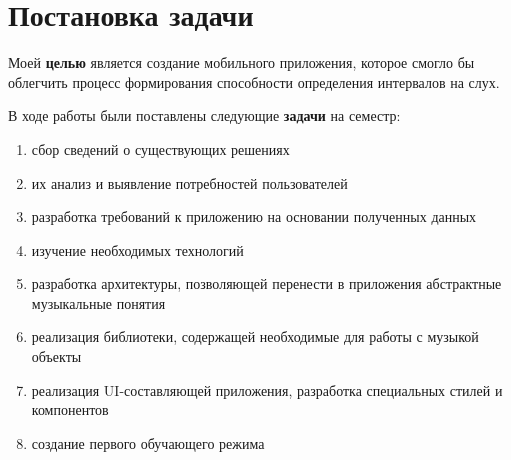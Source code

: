 \chapter{Постановка задачи}
Моей \textbf{целью} является создание мобильного приложения, которое смогло бы облегчить процесс формирования способности определения интервалов на слух. \par
В ходе работы были поставлены следующие \textbf{задачи} на семестр:
\begin{enumerate}
\item сбор сведений о существующих решениях
\item их анализ и выявление потребностей пользователей
\item разработка требований к приложению на основании полученных данных
\item изучение необходимых технологий
\item разработка архитектуры, позволяющей перенести в приложения абстрактные музыкальные понятия
\item реализация библиотеки, содержащей необходимые для работы с музыкой объекты
\item реализация UI-составляющей приложения, разработка специальных стилей и компонентов
\item создание первого обучающего режима
\end{enumerate}\par